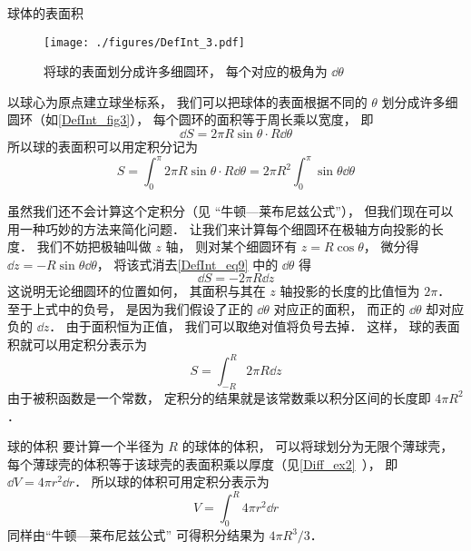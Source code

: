 \begin{example}{球体的表面积}\label{DefInt_ex3}

\begin{figure}[ht]
\centering
\texttt{[image: ./figures/DefInt\_3.pdf]}
\caption{将球的表面划分成许多细圆环， 每个对应的极角为 $\dd{\theta}$} \label{DefInt_fig3}
\end{figure}

以球心为原点建立球坐标系， 我们可以把球体的表面根据不同的 $\theta$ 划分成许多细圆环（如\autoref{DefInt_fig3}）， 每个圆环的面积等于周长乘以宽度， 即
\begin{equation}\label{DefInt_eq9}
\dd{S} = 2\pi R\sin\theta \cdot R\dd{\theta}
\end{equation}
所以球的表面积可以用定积分记为
\begin{equation}
S = \int_0^{\pi} 2\pi R\sin\theta \cdot R\dd{\theta} = 2\pi R^2 \int_0^{\pi} \sin\theta \dd{\theta}
\end{equation}

虽然我们还不会计算这个定积分（见 “牛顿—莱布尼兹公式”）， 但我们现在可以用一种巧妙的方法来简化问题． 让我们来计算每个细圆环在极轴方向投影的长度． 我们不妨把极轴叫做 $z$ 轴， 则对某个细圆环有 $z = R\cos\theta$， 微分得 $\dd{z} = -R\sin\theta \dd{\theta}$， 将该式消去\autoref{DefInt_eq9} 中的 $\dd{\theta}$ 得
\begin{equation}
\dd{S} = -2\pi R\dd{z}
\end{equation}
这说明无论细圆环的位置如何， 其面积与其在 $z$ 轴投影的长度的比值恒为 $2\pi$． 至于上式中的负号， 是因为我们假设了正的 $\dd{\theta}$ 对应正的面积， 而正的 $\dd{\theta}$ 却对应负的 $\dd{z}$． 由于面积恒为正值， 我们可以取绝对值将负号去掉． 这样， 球的表面积就可以用定积分表示为
\begin{equation}\label{DefInt_eq12}
S = \int_{-R}^{R} 2\pi R\dd{z}
\end{equation}
由于被积函数是一个常数， 定积分的结果就是该常数乘以积分区间的长度即 $4\pi R^2$．
\end{example}

\begin{example}{球的体积}\label{DefInt_ex4}
要计算一个半径为 $R$ 的球体的体积， 可以将球划分为无限个薄球壳， 每个薄球壳的体积等于该球壳的表面积乘以厚度（见\autoref{Diff_ex2}~）， 即 $\dd{V} = 4\pi r^2 \dd{r}$． 所以球的体积可用定积分表示为
\begin{equation}
V = \int_0^R 4\pi r^2 \dd{r}
\end{equation}
同样由“牛顿—莱布尼兹公式” 可得积分结果为 $4\pi R^3/3$．
\end{example}
